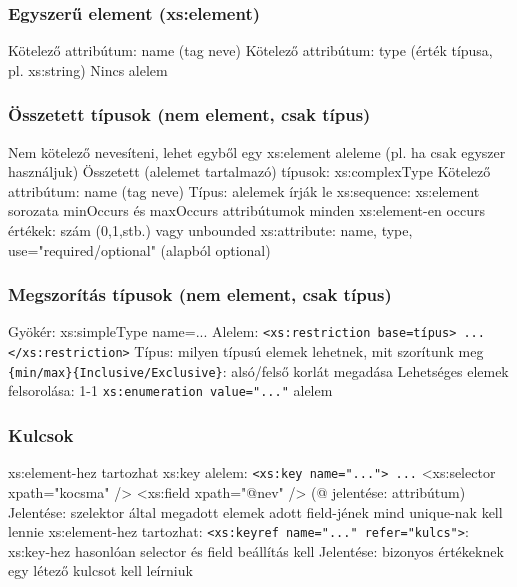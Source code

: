 \documentclass[12pt,a4paper]{article}
\begin{document}
\subsubsection{Egyszerű element (xs:element)}

\begin{outline}
	\1 Kötelező attribútum: name (tag neve)
	\1 Kötelező attribútum: type (érték típusa, pl. xs:string)
	\1 Nincs alelem
\end{outline}

\subsubsection{Összetett típusok (nem element, csak típus)}

\begin{outline}
	\1 Nem kötelező nevesíteni, lehet egyből egy xs:element aleleme (pl. ha csak egyszer használjuk)
	\1 Összetett (alelemet tartalmazó) típusok: xs:complexType
		\2 Kötelező attribútum: name (tag neve)
		\2 Típus: alelemek írják le
	\1 xs:sequence: xs:element sorozata
		\2 minOccurs és maxOccurs attribútumok minden xs:element-en
		\2 occurs értékek: szám (0,1,stb.) vagy unbounded
	\1 xs:attribute: name, type, use="required/optional" (alapból optional)
\end{outline}

\subsubsection{Megszorítás típusok (nem element, csak típus)}

\begin{outline}
	\1 Gyökér: xs:simpleType name=...
	\1 Alelem: \texttt{<xs:restriction base=típus> ... </xs:restriction>}
		\2 Típus: milyen típusú elemek lehetnek, mit szorítunk meg
		\2 \texttt{\{min/max\}\{Inclusive/Exclusive\}}: alsó/felső korlát megadása
	\1 Lehetséges elemek felsorolása: 1-1 \texttt{xs:enumeration value="..."} alelem
\end{outline}

\pagebreak

\subsubsection{Kulcsok}

\begin{outline}
	\1 xs:element-hez tartozhat xs:key alelem: \texttt{<xs:key name="..."> ...}
		\2 <xs:selector xpath="kocsma" />
		\2 <xs:field xpath="@nev" /> (@ jelentése: attribútum)
		\2 Jelentése: szelektor által megadott elemek adott field-jének mind unique-nak kell lennie
	\1 xs:element-hez tartozhat: \texttt{<xs:keyref name="..." refer="kulcs">}:
		\2 xs:key-hez hasonlóan selector és field beállítás kell
		\2 Jelentése: bizonyos értékeknek egy létező kulcsot kell leírniuk
\end{outline}
\end{document}
